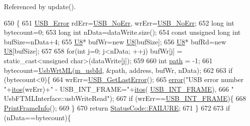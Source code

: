 Referenced by update().


\begin{DoxyCode}
650                                                                     \{
651   \hyperlink{LALUsbML_8h_aa7e5a2302774d5aa1d48a2a1cfc46e86}{USB\_Error} rdErr=\hyperlink{LALUsbML_8h_ab44759ae95dd86cbc2855adf525c43cd}{USB\_NoErr}, wrErr=\hyperlink{LALUsbML_8h_ab44759ae95dd86cbc2855adf525c43cd}{USB\_NoErr};
652   \textcolor{keywordtype}{long} \textcolor{keywordtype}{int} bytecount=0;
653   \textcolor{keywordtype}{long} \textcolor{keywordtype}{int} nData=dataWrite.size();
654   \textcolor{keyword}{const} \textcolor{keywordtype}{unsigned} \textcolor{keywordtype}{long} \textcolor{keywordtype}{int} bufSize=nData+4;
655   \hyperlink{ICECALv3_8h_a3cb25ca6f51f003950f9625ff05536fc}{U8}* bufWr=\textcolor{keyword}{new} \hyperlink{ICECALv3_8h_a3cb25ca6f51f003950f9625ff05536fc}{U8}[bufSize];
656   \hyperlink{ICECALv3_8h_a3cb25ca6f51f003950f9625ff05536fc}{U8}* bufRd=\textcolor{keyword}{new} \hyperlink{ICECALv3_8h_a3cb25ca6f51f003950f9625ff05536fc}{U8}[bufSize];
657 
658   \textcolor{keywordflow}{for}(\textcolor{keywordtype}{int} j=0; j<nData; ++j) bufWr[j] = static\_cast<unsigned char>(dataWrite[j]);
659 
660   \textcolor{keywordtype}{int} \hyperlink{classHierarchy_aa7990fa7caf132d83e361ce033c6c65a}{path} = -1;
661   bytecount=\hyperlink{LALUsbML_8h_aa0fcaafc2d95a37bb326abedcec12ca5}{UsbWrtML}(\hyperlink{classUsbFTMLInterface_aab6754587c303660d5c498ce34a2b4c8}{m\_usbId}, &path, address, bufWr, nData);
662 
663   \textcolor{keywordflow}{if} (bytecount<0)\{
664     wrErr=\hyperlink{LALUsbML_8h_a1662b77c9968848acf173f6f9c765ddd}{USB\_GetLastError}();
665     \hyperlink{classObject_a204a95f57818c0f811933917a30eff45}{error}(\textcolor{stringliteral}{"USB error number "}+\hyperlink{Tools_8h_af330027dbdafb9a30768b3613c553e60}{itos}(wrErr)+\textcolor{stringliteral}{" - USB\_INT\_FRAME="}+\hyperlink{Tools_8h_af330027dbdafb9a30768b3613c553e60}{itos}(
      \hyperlink{LALUsbML_8h_a68260f9cf3649507d12904cfa1592c11afd1c409187b1dfd3d66887a5e07e7ed3}{USB\_INT\_FRAME}),
666             \textcolor{stringliteral}{" UsbFTMLInterface::usbWriteRead"});
667     \textcolor{keywordflow}{if} (wrErr==\hyperlink{LALUsbML_8h_a68260f9cf3649507d12904cfa1592c11afd1c409187b1dfd3d66887a5e07e7ed3}{USB\_INT\_FRAME})\{
668       \hyperlink{LALUsbML_8h_ab3398c17204ba7fb4b47eb9bbf4ba94e}{PrintFrameInfo}();
669     \} 
670     \textcolor{keywordflow}{return} \hyperlink{classStatusCode_a6f565cbeadc76d14c72f047e5e85eb4ba3da73d4c469762eb9d3c960368252b26}{StatusCode::FAILURE};
671   \}
672 
673   \textcolor{keywordflow}{if} (nData==bytecount)\{

\end{DoxyCode}
